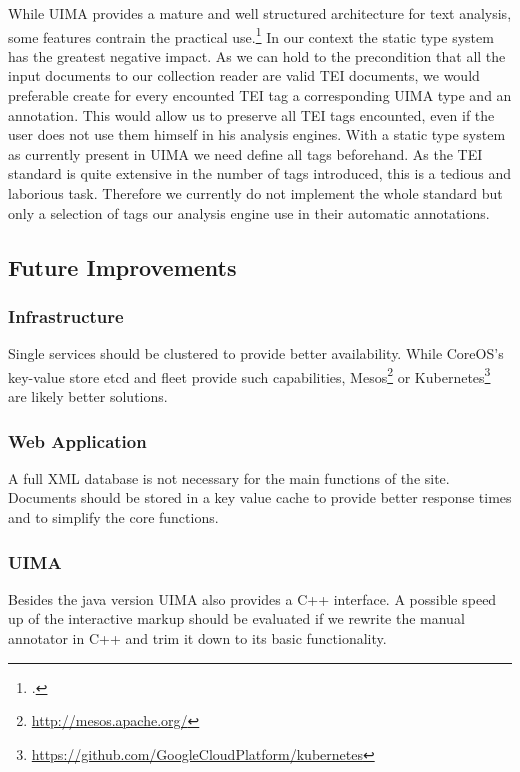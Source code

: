 \documentclass[12pt, draft]{article}
\begin{document}
While UIMA provides a mature and well structured architecture for text analysis,
some features contrain the practical use.\footcite{Goetz:2014}
In our context the static type system has the greatest negative impact.
As we can hold to the precondition that all the input documents to our
collection reader are valid TEI documents, we would preferable
create for every encounted TEI tag a corresponding UIMA type and an annotation. 
This would allow us to preserve all TEI tags encounted, even if the user does not use them
himself in his analysis engines. With a static type system
as currently present in UIMA we need define all tags beforehand.
As the TEI standard is quite extensive in the number of tags introduced,
this is a tedious and laborious task.
Therefore we currently do not implement the whole standard but only a selection of tags
our analysis engine use in their automatic annotations.

\subsection{Future Improvements}

\subsubsection{Infrastructure}
Single services should be clustered to provide better availability. While CoreOS's key-value store etcd
and fleet provide such capabilities, Mesos\footnote{\url{http://mesos.apache.org/}}
 or Kubernetes\footnote{\url{https://github.com/GoogleCloudPlatform/kubernetes}} are
 likely better solutions.

\subsubsection{Web Application}

A full XML database is not necessary for the main functions of the site.
Documents should be stored in a key value cache to provide
better response times and to simplify the core functions.

\subsubsection{UIMA}
Besides the java version UIMA also provides a C++ interface.
A possible speed up of the interactive markup should be evaluated
if we rewrite the manual annotator in C++ and trim it down to its basic
functionality.
\end{document}
